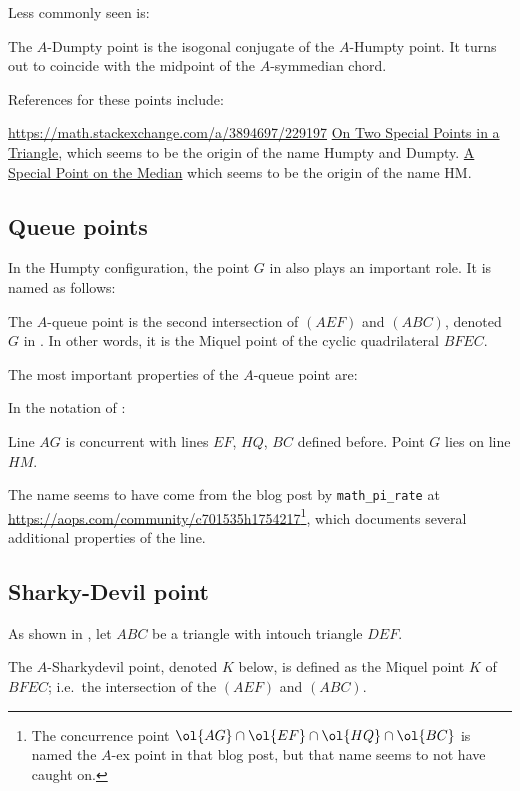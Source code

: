 \documentclass[11pt]{scrartcl}
\begin{document}
Less commonly seen is:
\begin{definition}
  The \alert{$A$-Dumpty point} is the isogonal conjugate of the $A$-Humpty point.
  It turns out to coincide with the midpoint of the $A$-symmedian chord.
\end{definition}

References for these points include:
\begin{itemize}
  \ii \url{https://math.stackexchange.com/a/3894697/229197}
  \ii \href{https://pregatirematematicaolimpiadejuniori.files.wordpress.com/2018/05/two_special_points__1_.pdf}
  {On Two Special Points in a Triangle},
  which seems to be the origin of the name Humpty and Dumpty.
  \ii \href{https://www.awesomemath.org/wp-pdf-files/math-reflections/mr-2017-02/article_1_a_special_point_on_the_median.pdf}
  {A Special Point on the Median}
  which seems to be the origin of the name HM.
\end{itemize}

\subsection{Queue points}
In the Humpty configuration, the point $G$ in 
also plays an important role.
It is named as follows:
\begin{definition}
  The \alert{$A$-queue point} is the second intersection of $(AEF)$ and $(ABC)$,
  denoted $G$ in .
  In other words, it is the Miquel point of the cyclic quadrilateral $BFEC$.
\end{definition}
The most important properties of the $A$-queue point are:
\begin{theorem}
  In the notation of :
  \begin{enumerate}
    \ii Line $AG$ is concurrent with lines $EF$, $HQ$, $BC$ defined before.
    \ii Point $G$ lies on line $HM$.
  \end{enumerate}
\end{theorem}
The name seems to have come from the blog post by \texttt{math\_pi\_rate} at
\url{https://aops.com/community/c701535h1754217}\footnote{The
  concurrence point $\ol{AG} \cap \ol{EF} \cap \ol{HQ} \cap \ol{BC}$
  is named the $A$-ex point in that blog post,
  but that name seems to not have caught on.},
which documents several additional properties of the line.

\subsection{Sharky-Devil point}
As shown in ,
let $ABC$ be a triangle with intouch triangle $DEF$.
\begin{definition}
  The \alert{$A$-Sharkydevil point}, denoted $K$ below,
  is defined as the Miquel point $K$ of $BFEC$;
  i.e.\ the intersection of the $(AEF)$ and $(ABC)$.
\end{definition}
\end{document}
